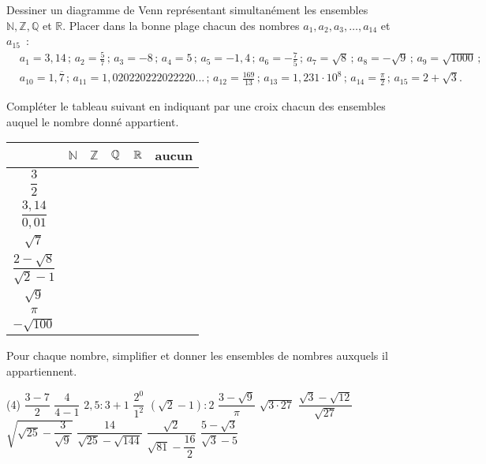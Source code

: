 \documentclass[a4paper,12pt]{report}
\begin{document}
\begin{exo}
Dessiner un diagramme de Venn représentant simultanément les ensembles $\mathbb{N}, \mathbb{Z}, \mathbb{Q}$ et $\mathbb{R}$. Placer dans la bonne plage chacun des nombres $a_1, a_2, a_3, \ldots, a_{14}$ et $a_{15}$~:
\[
\begin{aligned}
& a_1=3,14\,;\,a_2=\frac{5}{7}\,;\,a_3=-8\,;\,a_4=5\,;\,a_5=-1,4\,;\,a_6=-\frac{7}{5}\,;\,a_7=\sqrt{8}\,;\,a_8=-\sqrt{9}\,;\,a_9=\sqrt{1000}\,;\,\\
& a_{10}=1, \overline{7}\,;\,a_{11}=1,020220222022220 \ldots\,;\,a_{12}=\frac{169}{13}\,;\,a_{13}=1,231 \cdot 10^8\,;\,a_{14}=\frac{\pi}{2}\,;\,a_{15}=2+\sqrt{3} .
\end{aligned}
\]
\end{exo}
\begin{exo}
Compléter le tableau suivant en indiquant par une croix chacun des ensembles auquel le nombre donné appartient.
\begin{center}
\begin{tabular}{c|c|c|c|c|c|} 
& $\mathbb{N}$ & $\mathbb{Z}$ & $\mathbb Q$ & $\mathbb R$ & aucun \\
\hline\rule{0pt}{4ex}
	$\dfrac{3}{2}$ & & & & & \\[2ex]
\hline\rule{0pt}{4ex}
	$\dfrac{3,14}{0,01}$ & & & & & \\[2ex]
\hline\rule{0pt}{3ex}
$\sqrt{7}$ & & & & & \\
\hline\rule{0pt}{4ex}
$\dfrac{2-\sqrt{8}}{\sqrt{2}-1}$ & & & & & \\[2ex]
\hline\rule{0pt}{3ex}
$\sqrt{9}$ & & & & & \\
\hline$\pi$ & & & & & \\
\hline\rule{0pt}{3ex}
$-\sqrt{100}$ & & & & & \\
\hline
\end{tabular}
\end{center}
\end{exo}

\begin{exo}
Pour chaque nombre, simplifier et donner les ensembles de nombres auxquels il appartiennent.
\begin{tasks}(4)
\task $\dfrac{3-7}{2}$
\task $\dfrac{4}{4-1}$
\task $2,5: 3+1$
\task $\dfrac{2^0}{1^2}$
\task $(\sqrt{2}-1): 2$
\task $\dfrac{3-\sqrt{9}}{\pi}$
\task $\sqrt{3 \cdot 27}$
\task $\dfrac{\sqrt{3}-\sqrt{12}}{\sqrt{27}}$
\task $\sqrt{\sqrt{25}-\dfrac{3}{\sqrt{9}}}$
\task $\dfrac{14}{\sqrt{25}-\sqrt{144}}$
\task $\dfrac{\sqrt{2}}{\sqrt{81}-\dfrac{16}{2}}$
\task $\dfrac{5-\sqrt{3}}{\sqrt{3}-5}$
\end{tasks}
\end{exo} 
\end{document}
